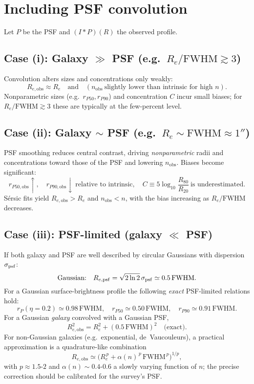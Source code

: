 \documentclass[12pt]{article}
\begin{document}
\section*{Including PSF convolution}

Let $P$ be the PSF and $(I\ast P)(R)$ the observed profile.

\subsection*{Case (i): Galaxy $\gg$ PSF (e.g.\ $R_e/\mathrm{FWHM}\gtrsim 3$)}
Convolution alters sizes and concentrations only weakly:
\[
R_{e,\mathrm{obs}} \approx R_e\quad\text{and}\quad
(n_{\mathrm{obs}}\ \text{slightly lower than intrinsic for high }n).
\]
Nonparametric sizes (e.g.\ $r_{P50}, r_{P90}$) and concentration $C$ incur small biases; for $R_e/\mathrm{FWHM}\gtrsim 3$ these are typically at the few-percent level.

\subsection*{Case (ii): Galaxy $\sim$ PSF (e.g.\ $R_e\!\sim\!\mathrm{FWHM}\!\approx\!1''$)}
PSF smoothing reduces central contrast, driving \emph{nonparametric} radii and concentrations toward those of the PSF and lowering $n_{\mathrm{obs}}$. Biases become significant:
\[
r_{P50,\mathrm{obs}}\!\uparrow,\quad r_{P90,\mathrm{obs}}\!\downarrow\ \text{relative to intrinsic},
\quad C\equiv 5\log_{10}\!\frac{R_{80}}{R_{20}}\ \text{is underestimated}.
\]
Sérsic fits yield $R_{e,\mathrm{obs}}>R_e$ and $n_{\mathrm{obs}}<n$, with the bias increasing as $R_e/\mathrm{FWHM}$ decreases.

\subsection*{Case (iii): PSF-limited (galaxy $\ll$ PSF)}
If both galaxy and PSF are well described by circular Gaussians with dispersion $\sigma_{\rm psf}$:
\[
\text{Gaussian:}\quad R_{e,\mathrm{psf}}=\sqrt{2\ln2}\,\sigma_{\rm psf}\simeq 0.5\,\mathrm{FWHM}.
\]
For a Gaussian surface-brightness profile the following \emph{exact} PSF-limited relations hold:
\[
r_{P}(\eta{=}0.2)\simeq 0.98\,\mathrm{FWHM},\quad
r_{P50}\simeq 0.50\,\mathrm{FWHM},\quad
r_{P90}\simeq 0.91\,\mathrm{FWHM}.
\]
For a Gaussian \emph{galaxy} convolved with a Gaussian PSF,
\[
R_{e,\mathrm{obs}}^2 = R_e^2 + (0.5\,\mathrm{FWHM})^2 \quad \text{(exact)}.
\]
For non-Gaussian galaxies (e.g.\ exponential, de~Vaucouleurs),
a practical approximation is a quadrature-like combination
\[
R_{e,\mathrm{obs}} \simeq \Big(R_e^{\,p} + \alpha(n)^{\,p}\,\mathrm{FWHM}^{\,p}\Big)^{1/p},
\]
with $p\approx 1.5$-$2$ and $\alpha(n)\sim 0.4$-$0.6$ a slowly varying function of $n$; the precise correction should be calibrated for the survey’s PSF.
\end{document}
